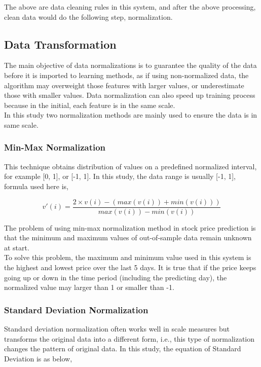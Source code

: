 The above are data cleaning rules in this system, and after the above processing, clean data would do the following step, normalization.

\subsection{Data Transformation}


The main objective of data normalizations is to guarantee the quality of the data before it is imported to learning methods, as if using non-normalized data, the algorithm may overweight those features with larger values, or underestimate those with smaller values. Data normalization can also speed up training process because in the initial, each feature is in the same scale.\\


In this study two normalization methods are mainly used to ensure the data is in same scale.


\subsubsection{Min-Max Normalization}
This technique obtains distribution of values on a predefined normalized interval, for example [0, 1], or [-1, 1]. In this study, the data range is usually [-1, 1], formula used here is,


\begin{equation}
v'(i)=\frac{2\times v(i)- (max(v(i))+min(v(i)))}{max(v(i))-min(v(i))}
\end{equation}


The problem of using min-max normalization method in stock price prediction is that the minimum and maximum values of out-of-sample data remain unknown at start. \\


To solve this problem, the maximum and minimum value used in this system is the highest and lowest price over the last 5 days. It is true that if the price keeps going up or down in the time period (including the predicting day), the normalized value may larger than 1 or smaller than -1.


\subsubsection{Standard Deviation Normalization}


Standard deviation normalization often works well in scale measures but transforms the original data into a different form, i.e., this type of normalization changes the pattern of original data. In this study, the equation of Standard Deviation is as below,


